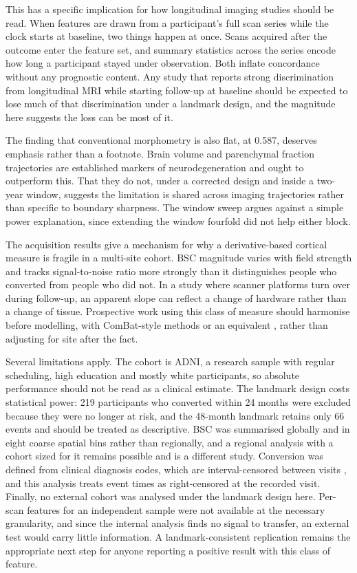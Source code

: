 \documentclass[blue]{ludusofficial}
\begin{document}
This has a specific implication for how longitudinal imaging studies should be read. When features are drawn from a participant's full scan series while the clock starts at baseline, two things happen at once. Scans acquired after the outcome enter the feature set, and summary statistics across the series encode how long a participant stayed under observation. Both inflate concordance without any prognostic content. Any study that reports strong discrimination from longitudinal MRI while starting follow-up at baseline should be expected to lose much of that discrimination under a landmark design, and the magnitude here suggests the loss can be most of it.

The finding that conventional morphometry is also flat, at 0.587, deserves emphasis rather than a footnote. Brain volume and parenchymal fraction trajectories are established markers of neurodegeneration and ought to outperform this. That they do not, under a corrected design and inside a two-year window, suggests the limitation is shared across imaging trajectories rather than specific to boundary sharpness. The window sweep argues against a simple power explanation, since extending the window fourfold did not help either block.

The acquisition results give a mechanism for why a derivative-based cortical measure is fragile in a multi-site cohort. BSC magnitude varies with field strength and tracks signal-to-noise ratio more strongly than it distinguishes people who converted from people who did not. In a study where scanner platforms turn over during follow-up, an apparent slope can reflect a change of hardware rather than a change of tissue. Prospective work using this class of measure should harmonise before modelling, with ComBat-style methods or an equivalent \cite{fortin2018harmonization}, rather than adjusting for site after the fact.

Several limitations apply. The cohort is ADNI, a research sample with regular scheduling, high education and mostly white participants, so absolute performance should not be read as a clinical estimate. The landmark design costs statistical power: 219 participants who converted within 24 months were excluded because they were no longer at risk, and the 48-month landmark retains only 66 events and should be treated as descriptive. BSC was summarised globally and in eight coarse spatial bins rather than regionally, and a regional analysis with a cohort sized for it remains possible and is a different study. Conversion was defined from clinical diagnosis codes, which are interval-censored between visits \cite{zhang2024interval}, and this analysis treats event times as right-censored at the recorded visit. Finally, no external cohort was analysed under the landmark design here. Per-scan features for an independent sample were not available at the necessary granularity, and since the internal analysis finds no signal to transfer, an external test would carry little information. A landmark-consistent replication remains the appropriate next step for anyone reporting a positive result with this class of feature.
\end{document}

